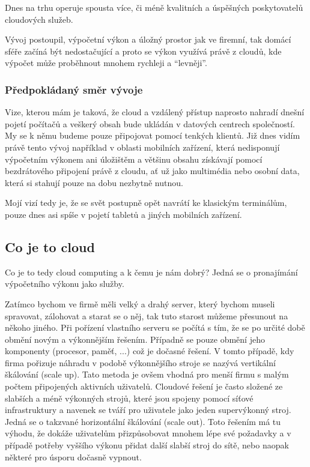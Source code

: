 Dnes na trhu operuje spousta více, či méně kvalitních a úspěšných poskytovatelů cloudových služeb.

Vývoj postoupil, výpočetní výkon a úložný prostor jak ve firemní, tak domácí sféře začíná být nedostačující a proto se výkon využívá právě z cloudů, kde výpočet může proběhnout mnohem rychleji a "`levněji"'.

\subsubsection{Předpokládaný směr vývoje}
Vize, kterou mám je taková, že cloud a vzdálený přístup naprosto nahradí dnešní pojetí počítačů a veškerý obsah bude ukládán v datových centrech společností. My se k němu budeme pouze připojovat pomocí tenkých klientů. Již dnes vidím právě tento vývoj například v oblasti mobilních zařízení, která nedisponují výpočetním výkonem ani úložištěm a většinu obsahu získávají pomocí bezdrátového připojení právě z cloudu, ať už jako multimédia nebo osobní data, která si stahují pouze na dobu nezbytně nutnou.

Mojí vizí tedy je, že se svět postupně opět navrátí ke klasickým terminálům, pouze dnes asi spíše v pojetí tabletů a jiných mobilních zařízení.

\subsection{Co je to cloud}
Co je to tedy cloud computing a k čemu je nám dobrý? Jedná se o pronajímání výpočetního výkonu jako služby.

Zatímco bychom ve firmě měli velký a drahý server, který bychom museli spravovat, zálohovat a starat se o něj, tak tuto starost můžeme přesunout na někoho jiného. Při pořízení vlastního serveru se počítá s tím, že se po určité době obmění novým a výkonnějším řešením. Případně se pouze obmění jeho komponenty (procesor, paměť, ...) což je dočasné řešení. V tomto případě, kdy firma pořizuje náhradu v podobě výkonnějšího stroje se nazývá vertikální škálování (scale up). Tato metoda je ovšem vhodná pro menší firmu s malým počtem připojených aktivních uživatelů. Cloudové řešení je často složené ze slabších a méně výkonných strojů, které jsou spojeny pomocí síťové infrastruktury a navenek se tváří pro uživatele jako jeden supervýkonný stroj. Jedná se o takzvané horizontální škálování (scale out). Toto řešením má tu výhodu, že dokáže uživatelům přizpůsobovat mnohem lépe své požadavky a v případě potřeby vyššího výkonu přidat další slabší stroj do sítě, nebo naopak některé pro úsporu dočasně vypnout.\cite{wiki:Skalovatelnost}

